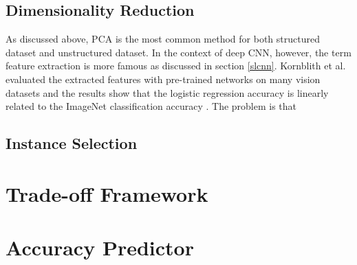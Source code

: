 \subsection{Dimensionality Reduction}
As discussed above, PCA is the most common method for both structured dataset and unstructured dataset. In the context of deep CNN, however, the term feature extraction is more famous as discussed in section \ref{slcnn}. Kornblith et al. evaluated the extracted features with pre-trained networks on many vision datasets and the results show that the logistic regression accuracy is linearly related to the ImageNet classification accuracy \cite{Kornblith2018}. The problem is that   



\subsection{Instance Selection}



\section{Trade-off Framework}

\section{Accuracy Predictor}